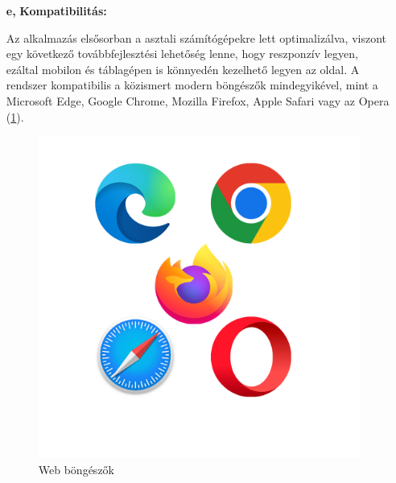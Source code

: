 \begin{itemize}
	\pagebreak
	\item[\textbf{e,}] \textbf{Kompatibilitás:}

Az alkalmazás elsősorban a asztali számítógépekre lett optimalizálva, viszont egy következő továbbfejlesztési lehetőség lenne, hogy reszponzív legyen, ezáltal mobilon és táblagépen is könnyedén kezelhető legyen az oldal. A rendszer kompatibilis a közismert modern böngészők mindegyikével, mint a Microsoft Edge, Google Chrome, Mozilla Firefox, Apple Safari vagy az Opera (\ref{abra:browserLogos}).

\begin{figure}[!h]
	\centering
	\includegraphics[scale=0.2]{images/browserLogos}
	\caption{Web böngészők}
	\label{abra:browserLogos}
\end{figure}
\end{itemize}